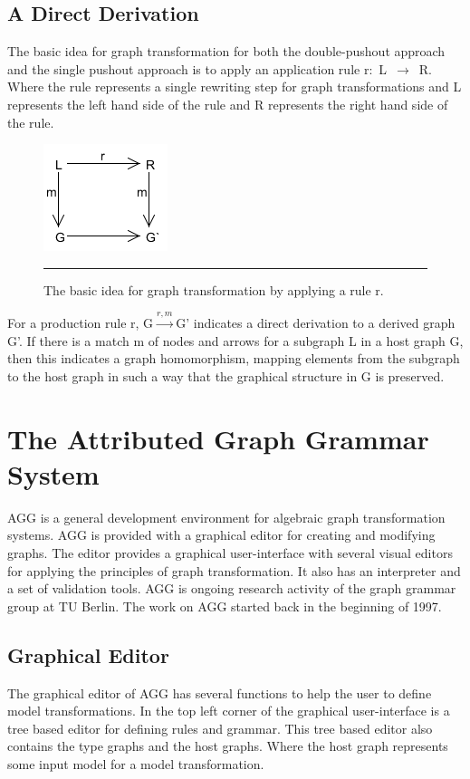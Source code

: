 \subsection{A Direct Derivation}
\noindent The basic idea for graph transformation for both the double-pushout
approach and the single pushout approach is to apply an application rule
\mbox{r: L $\longrightarrow$ R}. Where the rule represents a single rewriting
step for graph transformations and L represents the left hand side of the rule and R
represents the right hand side of the rule.

\begin{figure}[htbp]
  \centering
    \includegraphics[scale=0.7]{./Figures/GraphTransformationGeneral.png}
    \rule{35em}{0.5pt}
  \caption[Applying model transformations by graph transformations]
  {The basic idea for graph transformation by applying a rule r.}
  \label{fig:categoryTheory}
\end{figure}

For a production rule r, \mbox{G$\xrightarrow{r,m}$G'} indicates a direct
derivation to a derived graph G'. If there is a match m of nodes and arrows for a
subgraph L in a host graph G, then this indicates a graph homomorphism, mapping
elements from the subgraph to the host graph in such a way that the graphical
structure in G is preserved.

\section{The Attributed Graph Grammar System}

\noindent AGG is a general development environment for algebraic graph
transformation systems. AGG is provided with a graphical editor for creating
and modifying graphs. The editor provides a graphical user-interface with
several visual editors for applying the principles of graph transformation. It
also has an interpreter and a set of validation tools. AGG is ongoing research
activity of the graph grammar group at TU Berlin. The work on AGG started back
in the beginning of 1997.

\subsection{Graphical Editor}
\noindent The graphical editor of AGG has several functions to help the user to
define model transformations. In the top left corner of the graphical user-interface is
a tree based editor for defining rules and grammar. This tree based editor also
contains the type graphs and the host graphs. Where the host graph represents
some input model for a model transformation.

